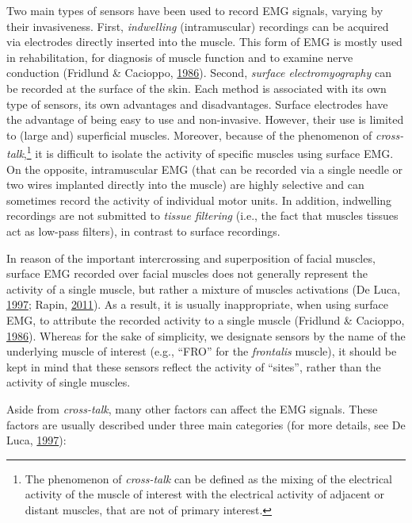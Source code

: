 \documentclass[a4paper,12pt,twoside,onecolumn,openright,final,oldfontcommands]{memoir}
\let\rmarkdownfootnote\footnote%
\def\footnote{\protect\rmarkdownfootnote}
\begin{document}
Two main types of sensors have been used to record EMG signals, varying by their invasiveness. First, \emph{indwelling} (intramuscular) recordings can be acquired via electrodes directly inserted into the muscle. This form of EMG is mostly used in rehabilitation, for diagnosis of muscle function and to examine nerve conduction (Fridlund \& Cacioppo, \protect\hyperlink{ref-fridlund_guidelines_1986}{1986}). Second, \emph{surface electromyography} can be recorded at the surface of the skin. Each method is associated with its own type of sensors, its own advantages and disadvantages. Surface electrodes have the advantage of being easy to use and non-invasive. However, their use is limited to (large and) superficial muscles. Moreover, because of the phenomenon of \emph{cross-talk},\footnote{The phenomenon of \emph{cross-talk} can be defined as the mixing of the electrical activity of the muscle of interest with the electrical activity of adjacent or distant muscles, that are not of primary interest.} it is difficult to isolate the activity of specific muscles using surface EMG. On the opposite, intramuscular EMG (that can be recorded via a single needle or two wires implanted directly into the muscle) are highly selective and can sometimes record the activity of individual motor units. In addition, indwelling recordings are not submitted to \emph{tissue filtering} (i.e., the fact that muscles tissues act as low-pass filters), in contrast to surface recordings.

In reason of the important intercrossing and superposition of facial muscles, surface EMG recorded over facial muscles does not generally represent the activity of a single muscle, but rather a mixture of muscles activations (De Luca, \protect\hyperlink{ref-de_luca_use_1997}{1997}; Rapin, \protect\hyperlink{ref-Rapin2011}{2011}). As a result, it is usually inappropriate, when using surface EMG, to attribute the recorded activity to a single muscle (Fridlund \& Cacioppo, \protect\hyperlink{ref-fridlund_guidelines_1986}{1986}). Whereas for the sake of simplicity, we designate sensors by the name of the underlying muscle of interest (e.g., \enquote{FRO} for the \emph{frontalis} muscle), it should be kept in mind that these sensors reflect the activity of \enquote{sites}, rather than the activity of single muscles.

Aside from \emph{cross-talk}, many other factors can affect the EMG signals. These factors are usually described under three main categories (for more details, see De Luca, \protect\hyperlink{ref-de_luca_use_1997}{1997}):
\end{document}
